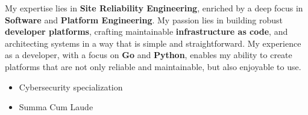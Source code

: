 \documentclass[10pt,a4paper,ragged2e,withhyper,hidelinks]{altacv}
\begin{document}

\begin{fullwidth}
  \makecvheader
\end{fullwidth}



\begin{paracol}{2}



  \small{My expertise lies in \textbf{Site Reliability Engineering}, enriched by a deep focus in \textbf{Software} and \textbf{Platform Engineering}. My passion lies in building robust \textbf{developer platforms}, crafting maintainable \textbf{infrastructure as code}, and architecting systems in a way that is simple and straightforward. My experience as a developer, with a focus on \textbf{Go} and \textbf{Python}, enables my ability to create platforms that are not only reliable and maintainable, but also enjoyable to use.}


  \switchcolumn




  \begin{itemize}
    \setlength{\itemindent}{0em}
    \item   \small{Cybersecurity specialization}
    \item   \small{Summa Cum Laude}
  \end{itemize}

\end{paracol}

\medskip
\smallskip
\end{document}
